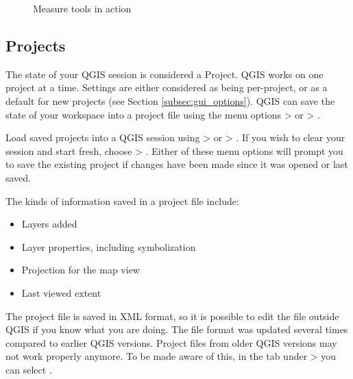 \begin{figure}[h]
\caption{Measure tools in action \nixcaption} \label{fig:measure}
\centering
   \goodgap
\end{figure}

\subsection{Projects}\label{sec:projects}

The state of your QGIS session is considered a Project.  QGIS
works on one project at a time.  Settings are either considered
as being per-project, or as a default for new projects (see
Section \ref{subsec:gui_options}). QGIS can save the state of your 
workspace into a project file using the menu options 
 > 
or  > .

Load saved projects into a QGIS session using 
 > 
or  > .
If you wish to clear your session and start fresh, choose
 > .
Either of these menu options will prompt you to save the existing project
if changes have been made since it was opened or last saved.

The kinds of information saved in a project file include:

\begin{itemize}
\item Layers added
\item Layer properties, including symbolization
\item Projection for the map view
\item Last viewed extent
\end{itemize}

The project file is saved in XML format, so it is possible to edit
the file outside QGIS if you know what you are doing. The file format 
was updated several times compared to earlier QGIS versions. Project files 
from older QGIS versions may not work properly anymore. To be made aware of this, 
in the  tab under  >  
you can select .

